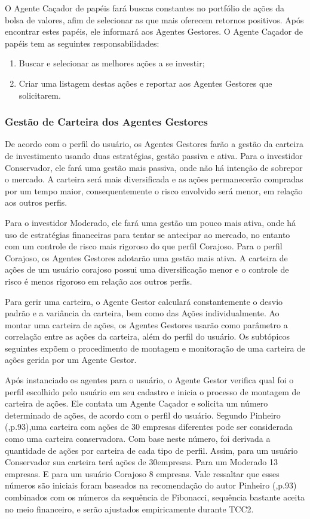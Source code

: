 O Agente Caçador de papéis fará buscas constantes no portfólio de ações da bolsa  de valores, afim de selecionar as que mais oferecem retornos positivos. Após encontrar estes papéis, ele informará aos Agentes Gestores. O Agente Caçador de papéis tem as seguintes responsabilidades: 
\begin{enumerate}
\item Buscar e selecionar as melhores ações a se investir;
\item Criar uma listagem destas ações e reportar aos Agentes Gestores que solicitarem.
\end{enumerate}

\subsubsection{Gestão de Carteira dos Agentes Gestores}

De acordo com o perfil do usuário, os Agentes Gestores farão a gestão da carteira de investimento usando duas estratégias, gestão passiva e ativa. Para o investidor Conservador, ele fará uma gestão mais passiva, onde não há intenção de sobrepor o mercado. A carteira será mais diversificada e as ações permanecerão compradas por um tempo maior, consequentemente o risco envolvido será menor, em relação aos outros perfis.

Para o investidor Moderado, ele fará uma gestão um pouco mais ativa, onde há uso de estratégias financeiras para tentar se antecipar ao mercado, no entanto com um controle de risco mais rigoroso do que perfil Corajoso. Para o perfil Corajoso, os Agentes Gestores adotarão uma gestão mais ativa. A carteira de ações de um usuário corajoso possui uma diversificação menor e o controle de risco é menos rigoroso em relação aos outros perfis.

Para gerir uma carteira, o Agente Gestor calculará constantemente o desvio padrão e a variância da carteira, bem como das Ações individualmente. Ao montar uma carteira de ações, os Agentes Gestores usarão como parâmetro a correlação entre as ações da carteira, além do perfil do usuário. Os subtópicos seguintes expõem o procedimento de montagem e monitoração de uma carteira de ações gerida por um Agente Gestor.


Após instanciado os agentes para o usuário, o Agente Gestor verifica qual foi o perfil escolhido pelo usuário em seu cadastro e inicia o processo de montagem de carteira de ações. Ele contata um Agente Caçador e solicita um número determinado de ações, de acordo com o perfil do usuário. Segundo Pinheiro (\citeyear{pinheiro2008},p.93),uma carteira com ações de 30 empresas diferentes pode ser considerada como uma carteira conservadora. Com base neste número, foi derivada a quantidade de ações por carteira de cada tipo de perfil. Assim, para um usuário Conservador sua carteira terá ações de 30empresas. Para um Moderado 13 empresas. E para um usuário Corajoso 8 empresas. Vale ressaltar que esses números são iniciais foram baseados na recomendação do autor Pinheiro (\citeyear{pinheiro2008},p.93) combinados com os números da sequência de Fibonacci, sequência bastante aceita no meio financeiro, e serão ajustados empiricamente durante TCC2.


